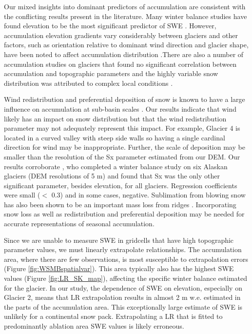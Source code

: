 \documentclass[twocolumn, letterpaper]{igs}
\begin{document}
Our mixed insights into dominant predictors of accumulation are consistent with the conflicting results present in the literature. Many winter balance studies have found elevation to be the most significant predictor of SWE \citep[e.g.][]{Machguth2006, McGrath2015}. However, accumulation elevation gradients vary considerably between glaciers \citep[e.g.][]{Winther1998} and other factors, such as
orientation relative to dominant wind direction and glacier shape, have been noted to affect accumulation distribution \citep{Machguth2006,Grabiec2011}.There are also a number of accumulation studies on glaciers that found no significant correlation between accumulation and
topographic parameters and the highly variable snow distribution was attributed to complex local conditions \citep[e.g.][]{Grabiec2011,Lopez2011}.

Wind redistribution and preferential deposition of snow is known to have a large influence on accumulation at sub-basin scales \citep[e.g.][]{Dadic2010, Winstral2013,Gerber2017}. Our results indicate that wind likely has an impact on snow distribution but that the wind redistribution parameter may not adequately represent this impact. For example, Glacier 4 is located in a curved valley with steep side walls so having a single cardinal direction for wind may be inappropriate. Further, the scale of deposition may be smaller than the resolution of the Sx parameter estimated from our DEM. Our results corroborate \cite{McGrath2015}, who completed a winter balance study on six Alaskan glaciers (DEM resolutions of 5 m) and found that Sx was the only other significant parameter, besides elevation, for all glaciers. Regression coefficients were small ($<$ 0.3) and in some cases, negative. Sublimation from blowing snow has also been shown to be an important mass loss from ridges  \citep[e.g.][]{Musselman2015}. Incorporating snow loss as well as redistribution and preferential deposition may be needed for accurate representations of seasonal accumulation.

Since we are unable to measure SWE in gridcells that have high topographic parameter values, we
must linearly extrapolate relationships. The accumulation area, where there are few observations, is most susceptible to extrapolation errors (Figure \ref{fig:WSMBspatialvar}). This area typically also has the highest SWE values (Figure \ref{fig:LR_SK_map}), affecting the specific winter balance estimated for the glacier. In our study, the dependence of SWE on elevation, especially on Glacier 2, means that LR extrapolation results in almost 2 m w.e. estimated in the parts of the accumulation area. This exceptionally large estimate of SWE is unlikely for a continental snow pack. Extrapolating a LR that is fitted to predominantly ablation area SWE values is likely erroneous.
\end{document}
